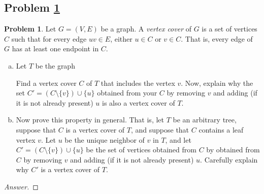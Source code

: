 \documentclass[11pt]{article}
\theoremstyle{definition}
\theoremstyle{definition}
\newtheorem{required}{Problem}
\theoremstyle{definition}
\begin{document}
\newpage
\subsection{Problem \ref{Exchange2}}
\begin{required} \label{Exchange2}
Let $G=(V, E)$ be a graph. A \emph{vertex cover} of $G$ is a set of vertices $C$ such that for every edge $uv \in E$, either $u \in C$ or $v \in C$. That is, every edge of $G$ has at least one endpoint in $C$. 

\begin{enumerate}[(a)]
    \item Let $T$ be the graph
    \begin{center}
    \end{center}
    Find a vertex cover $C$ of $T$ that includes the vertex $v$. 
    Now, explain why the set $C' = (C \setminus \{v\}) \cup \{u\}$ obtained from your $C$ by removing $v$ and adding (if it is not already present) $u$ is also a vertex cover of $T$.
    \item Now prove this property in general. That is, let $T$ be an arbitrary tree, suppose that $C$ is a vertex cover of $T$, and suppose that $C$ contains a leaf vertex $v$. 
    Let $u$ be the unique neighbor of $v$ in $T$, and let $C' = (C \setminus \{v\}) \cup \{u\}$ be the set of vertices obtained from $C$ by obtained from $C$ by removing $v$ and adding (if it is not already present) $u$. Carefully explain why $C'$ is a vertex cover of $T$.
\end{enumerate}

\begin{proof}[Answer]
\end{proof}


\end{required}

\end{document}
